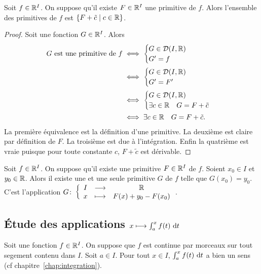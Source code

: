 \begin{theo}
  Soit \(f \in \mathbb{R}^I\). On suppose qu'il existe \(F \in \mathbb{R}^I\) une primitive de
  \(f\). Alors l'ensemble des primitives de \(f\) est \(\left\{F+\tilde{c}\mathrel{}\middle|\mathrel{}c
  \in \mathbb{R}\right\}\).
\end{theo}
\begin{proof}
  Soit une fonction \(G \in \mathbb{R}^I\). Alors
  \begin{align*}
    G \text{~est une primitive de~} f &\iff \begin{cases} G \in \mathcal{D}(I,\mathbb{R}) \\
    G' = f \end{cases} \\
    &\iff \begin{cases} G \in \mathcal{D}(I,\mathbb{R}) \\ G' = F' \end{cases} \\ &\iff
      \begin{cases} G \in \mathcal{D}(I,\mathbb{R}) \\ \exists c \in \mathbb{R} \quad G = F+\tilde{c}
      \end{cases} \\
      &\iff \exists c \in \mathbb{R} \quad G = F+\tilde{c}.
  \end{align*}
  La première équivalence est la définition d'une primitive. La deuxième est
  claire par définition de \(F\). La troisième est due à l'intégration. Enfin la
  quatrième est vraie puisque pour toute constante \(c\), \(F+\tilde{c}\) est
  dérivable.
\end{proof}

\begin{corth}
  Soit \(f \in \mathbb{R}^I\). On suppose qu'il existe une primitive \(F \in \mathbb{R}^I\) de
  \(f\). Soient \(x_0 \in I\) et \(y_0 \in \mathbb{R}\). Alors il existe une et une
  seule primitive \(G\) de \(f\) telle que \(G(x_0) = y_0\). C'est l'application
  \(G\colon\left\{\begin{array}{ccc}I & \longrightarrow &\mathbb{R}\\x & \longmapsto & F(x)+y_0-F(x_0)\end{array}\right.\).
\end{corth}

\subsection{Étude des applications \(x \longmapsto \int_a^x f(t)\,\mathop{}\mathopen{}\mathrm{d} t\)}

Soit une fonction \(f \in \mathbb{R}^I\). On suppose que \(f\) est continue par morceaux
sur tout segement contenu dans \(I\). Soit \(a \in I\). Pour tout \(x \in I\),
\(\int_a^xf(t)\,\mathop{}\mathopen{}\mathrm{d} t\) a bien un sens (cf chapitre~\ref{chap:integration}).

